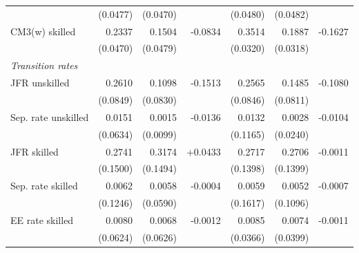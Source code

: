 \begin{table}[htbp]
\begin{tabular}{lrrrrrr}
     & {\scriptsize (0.0477)} & {\scriptsize (0.0470)} & & {\scriptsize (0.0480)} & {\scriptsize (0.0482)} & \\
    \quad CM3(w) skilled & 0.2337 & 0.1504 & -0.0834 & 0.3514 & 0.1887 & -0.1627 \\
     & {\scriptsize (0.0470)} & {\scriptsize (0.0479)} & & {\scriptsize (0.0320)} & {\scriptsize (0.0318)} & \\
    [4pt]
    \multicolumn{7}{l}{\textit{Transition rates}} \\[2pt]
    \quad JFR unskilled & 0.2610 & 0.1098 & -0.1513 & 0.2565 & 0.1485 & -0.1080 \\
     & {\scriptsize (0.0849)} & {\scriptsize (0.0830)} & & {\scriptsize (0.0846)} & {\scriptsize (0.0811)} & \\
    \quad Sep. rate unskilled & 0.0151 & 0.0015 & -0.0136 & 0.0132 & 0.0028 & -0.0104 \\
     & {\scriptsize (0.0634)} & {\scriptsize (0.0099)} & & {\scriptsize (0.1165)} & {\scriptsize (0.0240)} & \\
    \quad JFR skilled & 0.2741 & 0.3174 & +0.0433 & 0.2717 & 0.2706 & -0.0011 \\
     & {\scriptsize (0.1500)} & {\scriptsize (0.1494)} & & {\scriptsize (0.1398)} & {\scriptsize (0.1399)} & \\
    \quad Sep. rate skilled & 0.0062 & 0.0058 & -0.0004 & 0.0059 & 0.0052 & -0.0007 \\
     & {\scriptsize (0.1246)} & {\scriptsize (0.0590)} & & {\scriptsize (0.1617)} & {\scriptsize (0.1096)} & \\
    \quad EE rate skilled & 0.0080 & 0.0068 & -0.0012 & 0.0085 & 0.0074 & -0.0011 \\
     & {\scriptsize (0.0624)} & {\scriptsize (0.0626)} & & {\scriptsize (0.0366)} & {\scriptsize (0.0399)} & \\
    [4pt]
    \bottomrule
  \end{tabular}
\end{table}